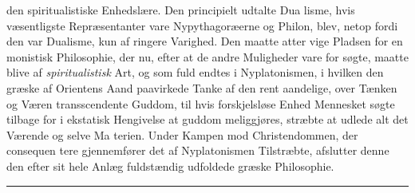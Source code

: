\documentclass[12pt,a4paper]{book}
\newcommand{\divrule}{\begin{center}\rule{2cm}{0.4pt}\end{center}}
\begin{document}
%
%
den spiritualistiske Enhedslære. Den principielt udtalte Dua\-%
lisme, hvis væsentligste Repræsentanter vare Nypythagoræerne
og Philon, blev, netop fordi den var Dualisme, kun af ringere
Varighed. Den maatte atter vige Pladsen for en monistisk
Philosophie, der nu, efter at de andre Muligheder vare for\-%
søgte, maatte blive af \emph{spiritualistisk} Art, og som fuld\-%
endtes i Nyplatonismen, i hvilken den græske af Orientens
Aand paavirkede Tanke af den rent aandelige, over Tænken og
Væren transscendente Guddom, til hvis forskjelsløse Enhed
Mennesket søgte tilbage for i ekstatisk Hengivelse at guddom\-%
meliggjøres, stræbte at udlede alt det Værende og selve Ma\-%
terien. Under Kampen mod Christendommen, der consequen\-%
tere gjennemfører det af Nyplatonismen Tilstræbte, afslutter
denne den efter sit hele Anlæg fuldstændig udfoldede græske
Philosophie.
\divrule
\end{document}
